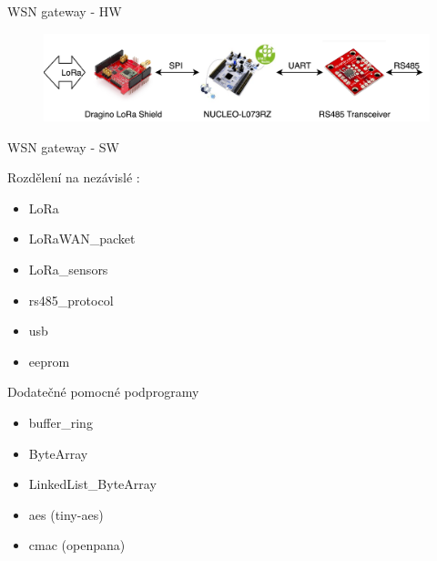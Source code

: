 \documentclass{beamer}
\begin{document}
  \begin{frame} {WSN gateway - HW}
	  
	\begin{figure}[!h]
		\centering
		\includegraphics[width=1\textwidth]{LoRaWAN_gw_RS485_blockDiagram_3}
		\label{fig:gatewayBlockDiagram}
	\end{figure}

  \end{frame}

  \begin{frame} {WSN gateway - SW}

	{\fontsize{9}{10}\selectfont 

		Rozdělení na nezávislé :
		\begin{itemize}
			\item LoRa
			\item LoRaWAN\_packet
			\item LoRa\_sensors
			\item rs485\_protocol
			\item usb
			\item eeprom
		\end{itemize}

		Dodatečné pomocné podprogramy
		\begin{itemize}
			\item buffer\_ring
			\item ByteArray
			\item LinkedList\_ByteArray
			\item aes (tiny-aes) \cite{lib_tiny-AES128-C} 
			\item cmac (openpana) \cite{lib_openpana}
		\end{itemize}
	}
  \end{frame}
\end{document}
